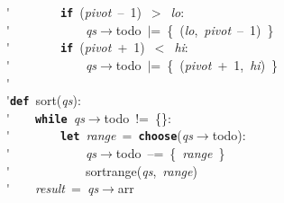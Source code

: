 \'\>~~~~~~~~\texttt{\textbf{if}}~(\textit{pivot}~--~1)~$>$~\textit{lo}:\\

\'\>~~~~~~~~~~~~\textit{qs}$\rightarrow$todo~$\vert$=~\{~(\textit{lo},~\textit{pivot}~--~1)~\}\\

\'\>~~~~~~~~\texttt{\textbf{if}}~(\textit{pivot}~+~1)~$<$~\textit{hi}:\\

\'\>~~~~~~~~~~~~\textit{qs}$\rightarrow$todo~$\vert$=~\{~(\textit{pivot}~+~1,~\textit{hi})~\}\\

\'\>\\

\'\>\texttt{\textbf{def}}~sort(\textit{qs}):\\

\'\>~~~~\texttt{\textbf{while}}~\textit{qs}$\rightarrow$todo~!=~\{\}:\\

\'\>~~~~~~~~\texttt{\textbf{let}}~\textit{range}~=~\texttt{\textbf{choose}}(\textit{qs}$\rightarrow$todo):\\

\'\>~~~~~~~~~~~~\textit{qs}$\rightarrow$todo~--=~\{~\textit{range}~\}\\

\'\>~~~~~~~~~~~~sortrange(\textit{qs},~\textit{range})\\

\'\>~~~~\textit{result}~=~\textit{qs}$\rightarrow$arr